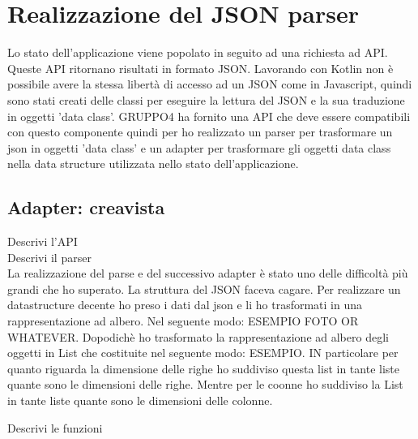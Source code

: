 \section{Realizzazione del JSON parser}
Lo stato dell'applicazione viene popolato in seguito ad una richiesta ad API. Queste API ritornano risultati in formato JSON. Lavorando con Kotlin non è possibile avere la stessa libertà di accesso ad un JSON come in Javascript, quindi sono stati creati delle classi per eseguire la lettura del JSON e la sua traduzione in oggetti 'data class'. GRUPPO4 ha fornito una API che deve essere compatibili con questo componente quindi per ho realizzato un parser per trasformare un json in oggetti 'data class' e un adapter per trasformare gli oggetti data class nella data structure utilizzata nello stato dell'applicazione.

\subsection{Adapter: creavista}
Descrivi l'API\\
Descrivi il parser\\
La realizzazione del parse e del successivo adapter è stato uno delle difficoltà più grandi che ho superato. La struttura del JSON faceva cagare. Per realizzare un datastructure decente ho preso i dati dal json e li ho trasformati in una rappresentazione ad albero. Nel seguente modo:
ESEMPIO FOTO OR WHATEVER.
Dopodichè ho trasformato la rappresentazione ad albero degli oggetti in List che costituite nel seguente modo: ESEMPIO. IN particolare per quanto riguarda la dimensione delle righe ho suddiviso questa list in tante liste quante sono le dimensioni delle righe. Mentre per le coonne ho suddiviso la List in tante liste quante sono le dimensioni delle colonne.

Descrivi le funzioni\\






